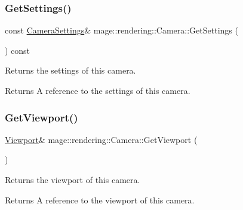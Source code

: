 \subsubsection{\texorpdfstring{Get\+Settings()}{GetSettings()}\hspace{0.1cm}{\footnotesize\ttfamily [2/2]}}
{\footnotesize\ttfamily const \hyperlink{classmage_1_1rendering_1_1_camera_settings}{Camera\+Settings}\& mage\+::rendering\+::\+Camera\+::\+Get\+Settings (\begin{DoxyParamCaption}{ }\end{DoxyParamCaption}) const\hspace{0.3cm}{\ttfamily [noexcept]}}

Returns the settings of this camera.

\begin{DoxyReturn}{Returns}
A reference to the settings of this camera. 
\end{DoxyReturn}
\hypertarget{classmage_1_1rendering_1_1_camera_aff1dea377f7f36b1d518369b3f8108cc}{}\label{classmage_1_1rendering_1_1_camera_aff1dea377f7f36b1d518369b3f8108cc} 
\subsubsection{\texorpdfstring{Get\+Viewport()}{GetViewport()}\hspace{0.1cm}{\footnotesize\ttfamily [1/2]}}
{\footnotesize\ttfamily \hyperlink{classmage_1_1rendering_1_1_viewport}{Viewport}\& mage\+::rendering\+::\+Camera\+::\+Get\+Viewport (\begin{DoxyParamCaption}{ }\end{DoxyParamCaption})\hspace{0.3cm}{\ttfamily [noexcept]}}

Returns the viewport of this camera.

\begin{DoxyReturn}{Returns}
A reference to the viewport of this camera. 
\end{DoxyReturn}
\hypertarget{classmage_1_1rendering_1_1_camera_a5d91ec5a395b638140c107a192faa2a3}{}\label{classmage_1_1rendering_1_1_camera_a5d91ec5a395b638140c107a192faa2a3} 

